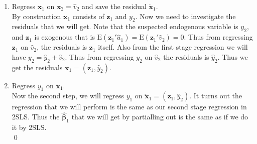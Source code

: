 \documentclass[10pt]{article}
\newcommand{\E}{\text{E}}
\begin{document}
\begin{enumerate}
    \item Regress $\textbf{x}_1$ on $\textbf{x}_2=\hat{v}_2$ and save the residual $\ddot{\textbf{x}}_1$.\\
    By construction $\textbf{x}_1$ consists of $\textbf{z}_1$ and $y_2$. Now we need to investigate the residuals that we will get. Note that the suspected endogenous variable is $y_2$, and $\textbf{z}_1$ is exogenous that is $\E(\textbf{z}_1'\hat{u}_1)=\E(\textbf{z}_1'\hat{v}_2)=0$. Thus from regressing $\textbf{z}_1$ on $\hat{v}_2$, the residuals is $\textbf{z}_1$ itself. Also from the first stage regression we will have $y_2=\hat{y}_2+\hat{v}_2$. Thus from regressing $y_2$ on $\hat{v}_2$ the residuals is $\hat{y}_2$. Thus we get the residuals $\ddot{\textbf{x}}_1=(\textbf{z}_1,\hat{y}_2)$.
    \item Regress $y_1$ on $\ddot{\textbf{x}}_1$.\\
    Now the second step, we will regress $y_1$ on $\ddot{\textbf{x}}_1=(\textbf{z}_1,\hat{y}_2)$. It turns out the regression that we will perform is the same as our second stage regression in 2SLS. Thus the $\hat{\pmb{\beta}}_1$ that we will get by partialling out is the same as if we do it by 2SLS.\\ \qed
\end{enumerate}
\end{document}

